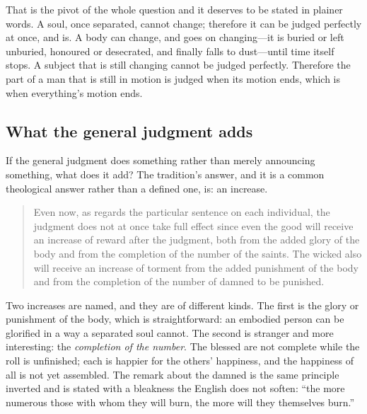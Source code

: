 That is the pivot of the whole question and it deserves to be stated in plainer words. A soul, once separated, cannot change; therefore it can be judged perfectly at once, and is. A body can change, and goes on changing---it is buried or left unburied, honoured or desecrated, and finally falls to dust---until time itself stops. A subject that is still changing cannot be judged perfectly. Therefore the part of a man that is still in motion is judged when its motion ends, which is when everything's motion ends.

\subsection{What the general judgment adds}

If the general judgment does something rather than merely announcing something, what does it add? The tradition's answer, and it is a common theological answer rather than a defined one, is: an increase.

\begin{quote}
Even now, as regards the particular sentence on each individual, the judgment does not at once take full effect since even the good will receive an increase of reward after the judgment, both from the added glory of the body and from the completion of the number of the saints. The wicked also will receive an increase of torment from the added punishment of the body and from the completion of the number of damned to be punished.
\end{quote}

Two increases are named, and they are of different kinds. The first is the glory or punishment of the body, which is straightforward: an embodied person can be glorified in a way a separated soul cannot. The second is stranger and more interesting: the \emph{completion of the number}. The blessed are not complete while the roll is unfinished; each is happier for the others' happiness, and the happiness of all is not yet assembled. The remark about the damned is the same principle inverted and is stated with a bleakness the English does not soften: ``the more numerous those with whom they will burn, the more will they themselves burn.''

